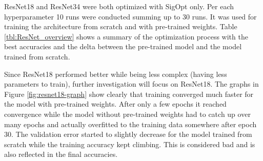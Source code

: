 ResNet18 and ResNet34 were both optimized with SigOpt only. Per each hyperparameter 10 runs were conducted summing up to 30 runs. It was used for training the architecture from scratch and with pre-trained weights. Table \ref{tbl:ResNet_overview} shows a summary of the optimization process with the best accuracies and the delta between the pre-trained model and the model trained from scratch.

\begin{table}[h] \centering
{}
\caption{Hyper parameters for ResNet18 and ResNet34 optimized with SigOpt. First row shows hyperparameters training the architecture from scratch. Second row used pre-trained weights from ImageNet}
\label{tbl:ResNet18}
\end{table}

Since ResNet18 performed better while being less complex (having less parameters to train), further investigation will focus on ResNet18.
The graphs in Figure \ref{fig:resnet18-graph} show clearly that training converged much faster for the model with pre-trained weights. After only a few epochs it reached convergence while the model without pre-trained weights had to catch up over many epochs and actually overfitted to the training data somewhere after epoch 30. The validation error started to slightly decrease for the model trained from scratch while the training accuracy kept climbing. This is considered bad and is also reflected in the final accuracies.

